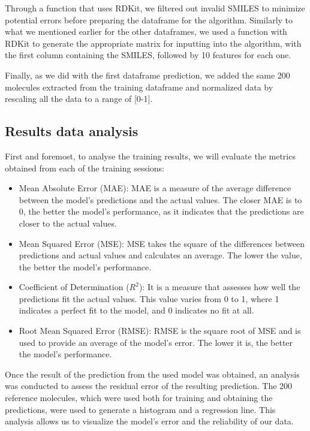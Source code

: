 \documentclass[final,times,twocolumn,article]{elsarticle}
\begin{document}
Through a function that uses RDKit, we filtered out invalid SMILES to minimize potential errors before preparing the dataframe for the algorithm. Similarly to what we mentioned earlier for the other dataframes, we used a function with RDKit to generate the appropriate matrix for inputting into the algorithm, with the first column containing the SMILES, followed by 10 features for each one. 

Finally, as we did with the first dataframe prediction, we added the same 200 molecules extracted from the training dataframe and normalized data by rescaling all the data to a range of [0-1].

\subsection{Results data analysis}

First and foremost, to analyse the training results, we will evaluate the metrics obtained from each of the training sessions:

\begin{itemize}
    \item Mean Absolute Error (MAE): MAE is a measure of the average difference between the model's predictions and the actual values. The closer MAE is to 0, the better the model's performance, as it indicates that the predictions are closer to the actual values.
    \item Mean Squared Error (MSE): MSE takes the square of the differences between predictions and actual values and calculates an average. The lower the value, the better the model's performance. 
    \item Coefficient of Determination ($R^2$): It is a measure that assesses how well the predictions fit the actual values. This value varies from 0 to 1, where 1 indicates a perfect fit to the model, and 0 indicates no fit at all. 
    \item Root Mean Squared Error (RMSE): RMSE is the square root of MSE and is used to provide an average of the model's error. The lower it is, the better the model's performance. 
    \end{itemize}

Once the result of the prediction from the used model was obtained, an analysis was conducted to assess the residual error of the resulting prediction. The 200 reference molecules, which were used both for training and obtaining the predictions, were used to generate a histogram and a regression line. This analysis allows us to visualize the model's error and the reliability of our data. 
\end{document}
